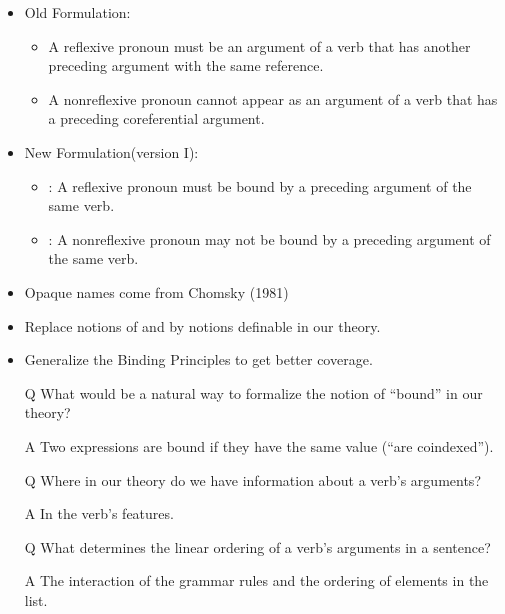 \documentclass[a4paper,landscape,headrule,footrule]{foils}
\begin{document}
\begin{itemize}
\item Old Formulation:
\begin{itemize}
\item A reflexive pronoun must be an argument of a verb that
has another preceding argument with the same reference.
\item A nonreflexive pronoun cannot appear as an argument of
a verb that has a preceding coreferential argument.
\end{itemize}
\item New Formulation(version I):
\begin{itemize}
\item {}: A reflexive pronoun must be
bound by a preceding argument of the same verb.
\item {}: A nonreflexive pronoun may not
be bound by a preceding argument of the same verb.
\end{itemize}
\item Opaque names come from Chomsky (1981)
\end{itemize}

\begin{itemize}
\item Replace notions of  and  by notions
definable in our theory.
\item Generalize the Binding Principles to get
better coverage.
\end{itemize}


\begin{itemize}
\item[Q]  What would be a natural way to formalize
the notion of “bound” in our theory?
\item[A] Two expressions are bound if
they have the same  value (“are
coindexed”).
\item[Q] Where in our theory do we have information
about a verb’s arguments?
\item[A] In the verb’s  features.
\item[Q] What determines the linear ordering of a
verb’s arguments in a sentence?
\item[A] The interaction of the grammar
rules and the ordering of elements in the
 list.
\end{itemize}
\end{document}
